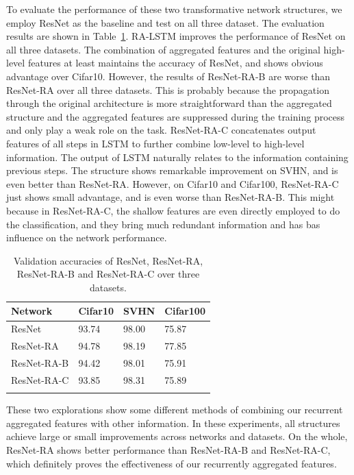 \documentclass[runningheads]{llncs}
\begin{document}
To evaluate the performance of these two transformative network structures, we employ ResNet as the baseline and test on all three dataset. The evaluation results are shown in Table~\ref{table:RA-B-C}. RA-LSTM improves the performance of ResNet on all three datasets. The combination of aggregated features and the original high-level features at least maintains the accuracy of ResNet, and shows obvious advantage over Cifar10. However, the results of ResNet-RA-B are worse than ResNet-RA over all three datasets. This is probably because the propagation through the original architecture is more straightforward than the aggregated structure and the aggregated features are suppressed during the training process and only play a weak role on the task. ResNet-RA-C concatenates output features of all steps in LSTM to further combine low-level to high-level information. The output of LSTM naturally relates to the information containing previous steps. The structure shows remarkable improvement on SVHN, and is even better than ResNet-RA. However, on Cifar10 and Cifar100, ResNet-RA-C just shows small advantage, and is even worse than ResNet-RA-B. This might because in ResNet-RA-C, the shallow features are even directly employed to do the classification, and they bring much redundant information and has  bas influence on the network performance.
\setlength{\tabcolsep}{4pt}
\begin{table}
\begin{center}
\caption{Validation accuracies of ResNet, ResNet-RA, ResNet-RA-B and ResNet-RA-C over three datasets.}
\label{table:RA-B-C}
\begin{tabular}{llll}
\hline\noalign{\smallskip}
Network& Cifar10 & SVHN & Cifar100\\
\hline
ResNet &93.74  &98.00  &75.87  \\
ResNet-RA  &94.78  &98.19  &77.85  \\
ResNet-RA-B  &94.42  &98.01  &75.91  \\
ResNet-RA-C  &93.85  &98.31  &75.89  \\
\noalign{\smallskip}
\hline
\noalign{\smallskip}

\end{tabular}
\end{center}
\end{table}
\setlength{\tabcolsep}{1.4pt}

These two explorations show some different methods of combining our recurrent aggregated features with other information. In these experiments, all structures achieve large or small improvements across networks and datasets. On the whole, ResNet-RA shows better performance than ResNet-RA-B and ResNet-RA-C, which definitely proves the effectiveness of our recurrently aggregated features.
\end{document}
